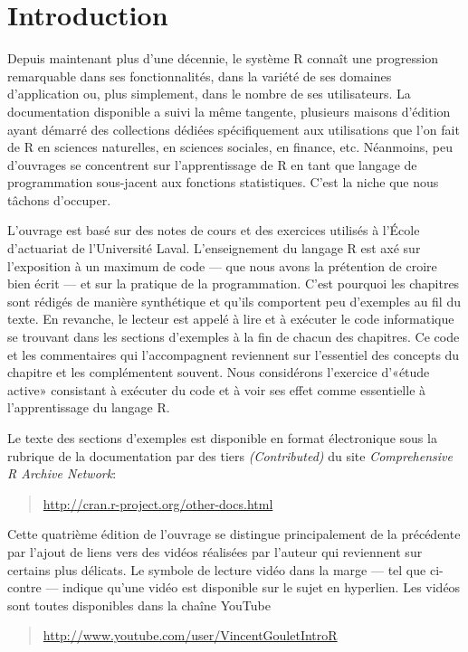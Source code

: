 \chapter*{Introduction}

Depuis maintenant plus d'une décennie, le système R connaît une
progression remarquable dans ses fonctionnalités, dans la variété de
ses domaines d'application ou, plus simplement, dans le nombre de ses
utilisateurs. La documentation disponible a suivi la même tangente,
plusieurs maisons d'édition ayant démarré des collections dédiées
spécifiquement aux utilisations que l'on fait de R en sciences
naturelles, en sciences sociales, en finance, etc. Néanmoins, peu
d'ouvrages se concentrent sur l'apprentissage de R en tant que langage
de programmation sous-jacent aux fonctions statistiques. C'est la
niche que nous tâchons d'occuper.

L'ouvrage est basé sur des notes de cours et des exercices utilisés à
l'École d'actuariat de l'Université Laval. L'enseignement du langage R
est axé sur l'exposition à un maximum de code --- que nous avons la
prétention de croire bien écrit --- et sur la pratique de la
programmation. C'est pourquoi les chapitres sont rédigés de manière
synthétique et qu'ils comportent peu d'exemples au fil du texte. En
revanche, le lecteur est appelé à lire et à exécuter le code
informatique se trouvant dans les sections d'exemples à la fin de
chacun des chapitres. Ce code et les commentaires qui l'accompagnent
reviennent sur l'essentiel des concepts du chapitre et les
complémentent souvent. Nous considérons l'exercice d'«étude active»
consistant à exécuter du code et à voir ses effet comme essentielle à
l'apprentissage du langage R.

Le texte des sections d'exemples est disponible en format électronique
sous la rubrique de la documentation par des tiers
\emph{(Contributed)} du site \emph{Comprehensive R Archive Network}:
\begin{quote}
  \url{http://cran.r-project.org/other-docs.html}
\end{quote}

Cette quatrième édition de l'ouvrage se distingue principalement de la
précédente par l'ajout de liens vers des vidéos réalisées par l'auteur
qui reviennent sur certains %
plus délicats. Le symbole de lecture vidéo dans la marge --- tel que
ci-contre --- indique qu'une vidéo est disponible sur le sujet en
hyperlien. Les vidéos sont toutes disponibles dans la chaîne YouTube
\begin{quote}
  \url{http://www.youtube.com/user/VincentGouletIntroR}
\end{quote}

